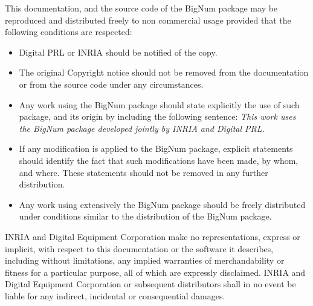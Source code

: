 This documentation, and the source code of the BigNum package may
be reproduced and distributed freely to non commercial usage provided
that the following conditions are respected:
\begin{itemize}
   \item Digital PRL or INRIA should be notified of the copy.

   \item The original Copyright notice should not be removed from the
   documentation or from the source code under any circumstances.
 
   \item Any work using the BigNum package should state explicitly the use
   of such package, and its origin by including the following sentence:
   {\em This work uses the BigNum package developed jointly by INRIA and
   Digital PRL.}

   \item If any modification is applied to the BigNum package,
   explicit statements should identify the fact that such modifications
   have been made, by whom, and where. These statements should not be
   removed in any further distribution.
 
   \item Any work using extensively the BigNum package should be freely
   distributed under conditions similar to the distribution of the
   BigNum package.
\end{itemize}
INRIA and Digital Equipment Corporation make no representations, 
express or implicit, with
respect to this documentation or the software it describes, including
without limitations, any implied warranties of merchandability or
fitness for a particular purpose, all of which are expressly
disclaimed. INRIA and Digital Equipment Corporation  or subsequent distributors 
shall in no event
be liable for any indirect, incidental or consequential damages.

